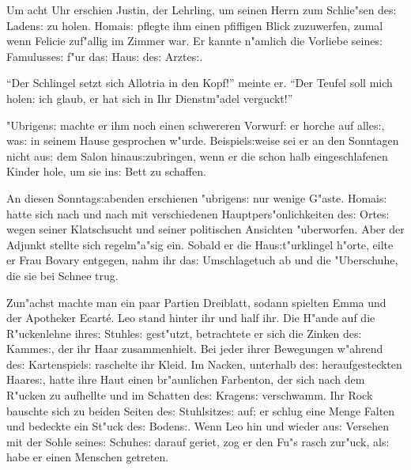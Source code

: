 \documentclass[oneside,12pt]{book}
\newcommand{\s}{s:}%
\begin{document}
Um acht Uhr erschien Justin, der Lehrling, um seinen Herrn zum
Schlie"sen de{\s} Laden{\s} zu holen. Homai{\s} pflegte ihm einen
pfiffigen Blick zuzuwerfen, zumal wenn Felicie zuf"allig im Zimmer
war. Er kannte n"amlich die Vorliebe seine{\s} Famulusse{\s} f"ur
da{\s} Hau{\s} de{\s} Arzte{\s}.

"`Der Schlingel setzt sich Allotria in den Kopf!"' meinte er.
"`Der Teufel soll mich holen: ich glaub, er hat sich in Ihr
Dienstm"adel verguckt!"'

"Ubrigen{\s} machte er ihm noch einen schwereren Vorwurf: er
horche auf alle{\s}, wa{\s} in seinem Hause gesprochen w"urde.
Beispiel{\s}weise sei er an den Sonntagen nicht au{\s} dem Salon
hinau{\s}zubringen, wenn er die schon halb eingeschlafenen Kinder
hole, um sie in{\s} Bett zu schaffen.

An diesen Sonntag{\s}abenden erschienen "ubrigen{\s} nur wenige
G"aste. Homai{\s} hatte sich nach und nach mit verschiedenen
Hauptpers"onlichkeiten de{\s} Orte{\s} wegen seiner Klatschsucht
und seiner politischen Ansichten "uberworfen. Aber der Adjunkt
stellte sich regelm"a"sig ein. Sobald er die Hau{\s}t"urklingel
h"orte, eilte er Frau Bovary entgegen, nahm ihr da{\s}
Umschlagetuch ab und die "Uberschuhe, die sie bei Schnee trug.

Zun"achst machte man ein paar Partien Dreiblatt, sodann spielten
Emma und der Apotheker Ecart\'e. Leo stand hinter ihr und half
ihr. Die H"ande auf die R"uckenlehne ihre{\s} Stuhle{\s}
gest"utzt, betrachtete er sich die Zinken de{\s} Kamme{\s}, der
ihr Haar zusammenhielt. Bei jeder ihrer Bewegungen w"ahrend de{\s}
Kartenspiel{\s} raschelte ihr Kleid. Im Nacken, unterhalb de{\s}
heraufgesteckten Haare{\s}, hatte ihre Haut einen br"aunlichen
Farbenton, der sich nach dem R"ucken zu aufhellte und im Schatten
de{\s} Kragen{\s} verschwamm. Ihr Rock bauschte sich zu beiden
Seiten de{\s} Stuhlsitze{\s} auf; er schlug eine Menge Falten und
bedeckte ein St"uck de{\s} Boden{\s}. Wenn Leo hin und wieder
au{\s} Versehen mit der Sohle seine{\s} Schuhe{\s} darauf geriet,
zog er den Fu"s rasch zur"uck, al{\s} habe er einen Menschen
getreten.
\end{document}

